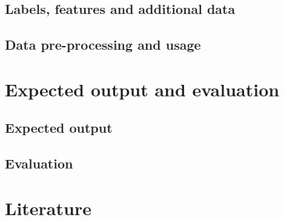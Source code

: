 \documentclass[11pt, a4paper]{article}
\begin{document}
\subsection{Labels, features and additional data}
\citet{codelijsten}
\citet{uurlonen}

\subsection{Data pre-processing and usage}


\section{Expected output and evaluation}
\subsection{Expected output}
\subsection{Evaluation}
\citet{cohen}


\section{Literature}

\end{document}
